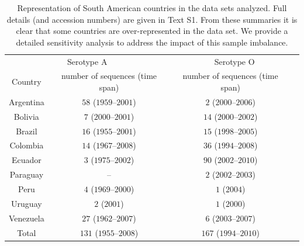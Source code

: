 \documentclass[a4paper,10pt]{article}
\begin{document}
\begin{table}[H]
 \caption{
 Representation of South American countries in the data sets analyzed.
 Full details (and accession numbers) are given in Text S1.
 From these summaries it is clear that some countries are over-represented in the data set.
 We provide a detailed sensitivity analysis to address the impact of this sample imbalance.
 }
 \begin{center}
 \begin{tabular}{cccc}
 \toprule
   \multicolumn{2}{c}{Serotype A}& \multicolumn{2}{c}{Serotype O}\\
 Country & number of sequences (time span)& number of sequences (time span) & \\ 
  \midrule
Argentina & $58$ ($1959$--$2001$)& $2$ ($2000$--$2006$)  \\
Bolivia   & $7$ ($2000$--$2001$)& $14$ ($2000$--$2002$)  \\
Brazil    & $16$ ($1955$--$2001$)& $15$ ($1998$--$2005$)  \\
Colombia  & $14$ ($1967$--$2008$)& $36$ ($1994$--$2008$)  \\
Ecuador   & $3$ ($1975$--$2002$)& $90$ ($2002$--$2010$)  \\
Paraguay                    & --& $2$ ($2002$--$2003$)  \\
Peru      & $4$ ($1969$--$2000$)& $1$ ($2004$)  \\
Uruguay   & $2$ ($2001$)& $1$ ($2000$)  \\
Venezuela & $27$ ($1962$--$2007$)& $6$ ($2003$--$2007$)  \\
Total     & $131$ ($1955$--$2008$) & $167$ ($1994$--$2010$)\\
  \bottomrule
 \end{tabular}
 \end{center}
\label{stab:reps}
\end{table}
\end{document}
